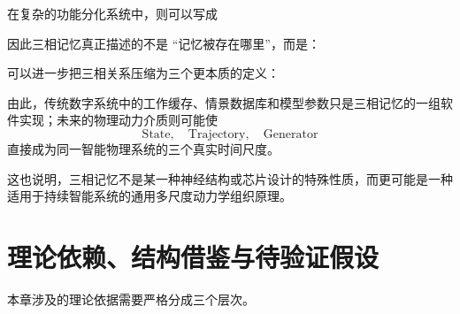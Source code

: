 在复杂的功能分化系统中，则可以写成
\begin{statementbox}
\centering
{}
\end{statementbox}
\begin{statementbox}
\centering
{}
\end{statementbox}
\begin{statementbox}
\centering
{}
\end{statementbox}

因此三相记忆真正描述的不是 ``记忆被存在哪里''，而是：
\begin{statementbox}
\centering
{}
\end{statementbox}

可以进一步把三相关系压缩为三个更本质的定义：
\begin{statementbox}
\centering
{}
\end{statementbox}
\begin{statementbox}
\centering
{}
\end{statementbox}
\begin{statementbox}
\centering
{}
\end{statementbox}

由此，传统数字系统中的工作缓存、情景数据库和模型参数只是三相记忆的一组软件实现；未来的物理动力介质则可能使
\[
\mathrm{State},
\quad
\mathrm{Trajectory},
\quad
\mathrm{Generator}
\]
直接成为同一智能物理系统的三个真实时间尺度。

这也说明，三相记忆不是某一种神经结构或芯片设计的特殊性质，而更可能是一种适用于持续智能系统的通用多尺度动力学组织原理。

\section{理论依赖、结构借鉴与待验证假设}

本章涉及的理论依据需要严格分成三个层次。

